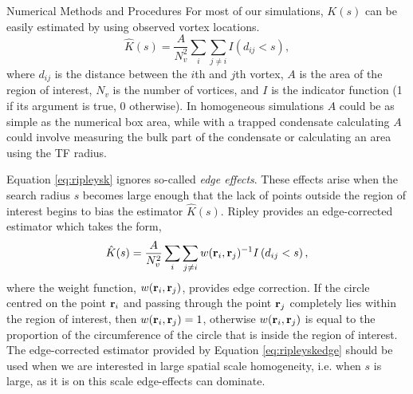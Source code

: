 \begin{chapter}{\label{cha:numerics}Numerical Methods and Procedures}
  For most of our simulations, $K(s)$ can be easily estimated by using observed vortex locations.
  \begin{equation}\label{eq:ripleysk}
    \hat{K}(s) = \frac{A}{N_v^2}\sum\limits_{i}\sum\limits_{j \ne i} I\left (d_{ij}<s\right ),
  \end{equation}
  where $d_{ij}$ is the distance between the $i$th and $j$th vortex, $A$ is the area of the region of interest, $N_v$ is the number of vortices, and $I$ is the indicator function (1 if its argument is true, 0 otherwise). In homogeneous simulations $A$ could be as simple as the numerical box area, while with a trapped condensate calculating $A$ could involve measuring the bulk part of the condensate or calculating an area using the TF radius.

  Equation \ref{eq:ripleysk} ignores so-called {\it edge effects}. These effects arise when the search radius $s$ becomes large enough that the lack of points outside the region of interest begins to bias the estimator $\hat{K}(s)$. Ripley provides an edge-corrected estimator \cite{ripley_1976} which takes the form,
  \begin{equation}\label{eq:ripleyskedge}
    \hat{K}(s) = \frac{A}{N_v^2}\sum\limits_{i}\sum\limits_{j \ne i} w({\bf r}_i,{\bf r}_j)^{-1}I\left (d_{ij}<s\right ),
  \end{equation}
  where the weight function, $w({\bf r}_i,{\bf r}_j)$, provides edge correction. If the circle centred on  the point ${\bf r}_i$ and passing through the point ${\bf r}_j$ completely lies within the region of interest, then $w({\bf r}_i,{\bf r}_j)=1$, otherwise $w({\bf r}_i,{\bf r}_j)$ is equal to the proportion of the circumference of the circle that is inside the region of interest. The edge-corrected estimator provided by Equation \ref{eq:ripleyskedge} should be used when we are interested in large spatial scale homogeneity, i.e. when $s$ is large, as it is on this scale edge-effects can dominate.


\end{chapter}
